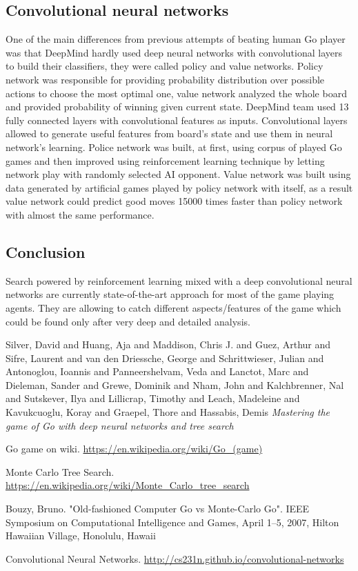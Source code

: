 \documentclass[11pt]{article}
\begin{document}
\subsection{Convolutional neural networks}

One of the main differences from previous attempts of beating human Go player was that DeepMind hardly used deep neural networks with convolutional layers to build their classifiers, they were called policy and value networks. Policy network was responsible for providing probability distribution over possible actions to choose the most optimal one, value network analyzed the whole board and provided probability of winning given current state. DeepMind team used 13 fully connected layers with convolutional features as inputs. Convolutional layers allowed to generate useful features from board's state and use them in neural network's learning. Police network was built, at first, using corpus of played Go games and then improved using reinforcement learning technique by letting network play with randomly selected AI opponent. Value network was built using data generated by artificial games played by policy network with itself, as a result value network could predict good moves 15000 times faster than policy network with almost the same performance. 


\subsection{Conclusion}

Search powered by reinforcement learning mixed with a deep convolutional neural networks are currently state-of-the-art approach for most of the game playing agents. They are allowing to catch different aspects/features of the game which could be found only after very deep and detailed analysis.

\begin{thebibliography}{9}

Silver, David and Huang, Aja and Maddison, Chris J. and Guez, Arthur and Sifre, Laurent and van den Driessche, George and Schrittwieser, Julian and Antonoglou, Ioannis and Panneershelvam, Veda and Lanctot, Marc and Dieleman, Sander and Grewe, Dominik and Nham, John and Kalchbrenner, Nal and Sutskever, Ilya and Lillicrap, Timothy and Leach, Madeleine and Kavukcuoglu, Koray and Graepel, Thore and Hassabis, Demis
\textit{Mastering the game of Go with deep neural networks and tree search}

Go game on wiki. \url{https://en.wikipedia.org/wiki/Go_(game)}

Monte Carlo Tree Search. \url{https://en.wikipedia.org/wiki/Monte_Carlo_tree_search}

Bouzy, Bruno. "Old-fashioned Computer Go vs Monte-Carlo Go". IEEE Symposium on Computational Intelligence and Games, April 1–5, 2007, Hilton Hawaiian Village, Honolulu, Hawaii

Convolutional Neural Networks. \url{http://cs231n.github.io/convolutional-networks}

\end{thebibliography}
\end{document}
